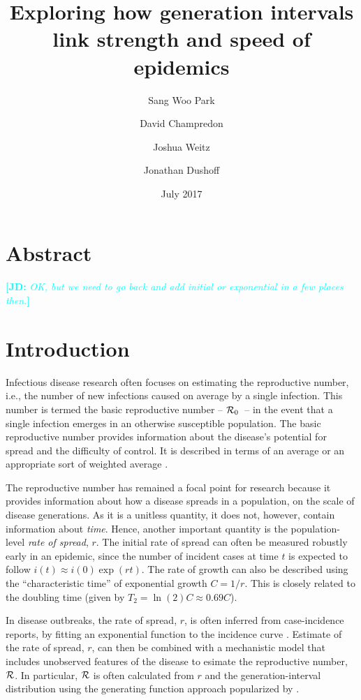 \documentclass[12pt,]{article}
\title{Exploring how generation intervals link strength and speed of epidemics}
\author{Sang Woo Park \and David Champredon \and Joshua Weitz \and Jonathan Dushoff}
\date{July 2017}
\newcommand{\RR}{\ensuremath{{\cal R}}}
\newcommand{\Rx}[1]{\ensuremath{{\cal R}_{#1}}}
\newcommand{\Ro}{\Rx{0}}
\newcommand{\Tc}{\ensuremath{C}}
\newcommand{\comment}[3]{\textcolor{#1}{\textbf{[#2: }\textit{#3}\textbf{]}}}
\newcommand{\jd}[1]{\comment{cyan}{JD}{#1}}
\begin{document}
\maketitle

\section*{Abstract}

\jd{OK, but we need to go back and add initial or exponential in a few places then.}

\section{Introduction}

Infectious disease research often focuses on estimating the reproductive number, i.e., the number of new infections caused on average by a single infection.
This number is termed the basic reproductive number -- \Ro\ -- in the event that a single infection emerges in an otherwise susceptible population.
The basic reproductive number provides information about the disease's potential for spread and the difficulty of control.
It is described in terms of an average \cite{AndeMay91} or an appropriate sort of weighted average \cite{DiekHees90}.

The reproductive number has remained a focal point for research because it provides information about how a disease spreads in a population, on the scale of disease generations.
As it is a unitless quantity, it does not, however, contain information about \emph{time}.
Hence, another important quantity is the population-level \emph{rate of spread}, $r$. The initial rate of spread can often be measured robustly early in an epidemic, since the number of incident cases at time $t$ is expected to follow $i(t) \approx i(0) \exp(r t)$. The rate of growth can also be described using the ``characteristic time'' of exponential growth $\Tc = 1/r$. This is closely related to the doubling time (given by $T_2 = \ln(2) \Tc \approx 0.69 \Tc$).

In disease outbreaks, the rate of spread, $r$, is often inferred from case-incidence reports, by fitting an exponential function to the incidence curve \cite{MillRobi04, NishCast09, MaJDush14}.
Estimate of the rate of spread, $r$, can then be combined with a mechanistic model that includes unobserved features of the disease to esimate the reproductive number, \RR.
In particular, $\RR$ is often calculated from $r$ and the generation-interval distribution using the generating function approach popularized by \cite{WallLips07}.
\end{document}
